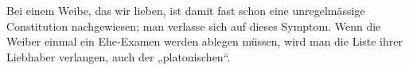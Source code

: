 Bei einem Weibe, das wir lieben, ist damit fast schon eine unregelmässige Constitution nachgewiesen; man verlasse sich auf dieses Symptom. Wenn die Weiber einmal ein Ehe-Examen werden ablegen müssen, wird man die Liste ihrer Liebhaber verlangen, auch der „platonischen“.
\par

